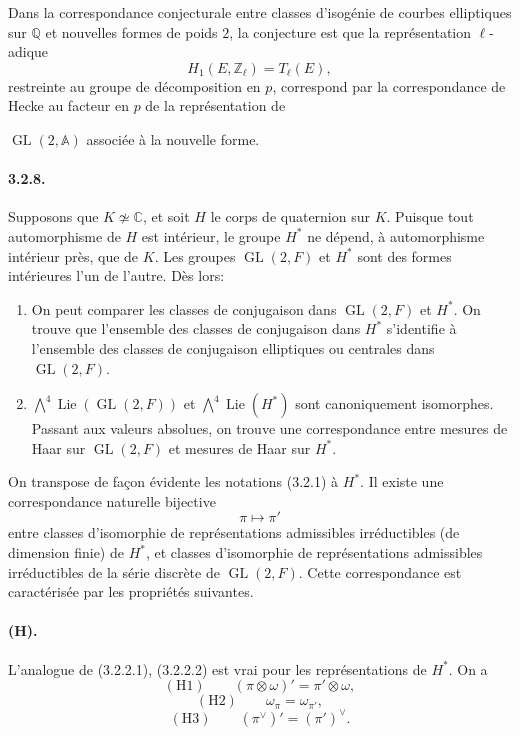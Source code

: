 \documentclass[10pt,a4paper]{article}
\providecommand{\GL}{\operatorname{GL}}
\providecommand{\Lie}{\operatorname{Lie}}
\providecommand{\Q}{\mathbb Q}
\providecommand{\Z}{\mathbb Z}
\providecommand{\C}{\mathbb C}
\providecommand{\A}{\mathbb A}
\begin{document}
Dans la correspondance conjecturale entre classes d'isogénie de courbes elliptiques sur \(\Q\) et nouvelles formes de poids \(2\), la conjecture est que la représentation \(\ell\)-adique
\[
H_1(E,\Z_\ell)=T_\ell(E),
\]
restreinte au groupe de décomposition en \(p\), correspond par la correspondance de Hecke au facteur en \(p\) de la représentation de

\clearpage
{}
\hypertarget{authority-48}{}
\(\GL(2,\A)\) associée à la nouvelle forme.

\paragraph{3.2.8.} Supposons que \(K\not\simeq\C\), et soit \(H\) \textquotedbl le\textquotedbl{} corps de quaternion sur \(K\). Puisque tout automorphisme de \(H\) est intérieur, le groupe \(H^*\) ne dépend, à automorphisme intérieur près, que de \(K\). Les groupes \(\GL(2,F)\) et \(H^*\) sont des formes intérieures l'un de l'autre. Dès lors:

\begin{enumerate}[label=(\alph*)]
\item On peut comparer les classes de conjugaison dans \(\GL(2,F)\) et \(H^*\). On trouve que l'ensemble des classes de conjugaison dans \(H^*\) s'identifie à l'ensemble des classes de conjugaison elliptiques ou centrales dans \(\GL(2,F)\).
\item \(\bigwedge^4\Lie(\GL(2,F))\) et \(\bigwedge^4\Lie(H^*)\) sont canoniquement isomorphes. Passant aux valeurs absolues, on trouve une correspondance entre mesures de Haar sur \(\GL(2,F)\) et mesures de Haar sur \(H^*\).
\end{enumerate}
On transpose de façon évidente les notations (3.2.1) à \(H^*\). Il existe une correspondance naturelle bijective
\[
\pi\longmapsto \pi'
\]
entre classes d'isomorphie de représentations admissibles irréductibles (de dimension finie) de \(H^*\), et classes d'isomorphie de représentations admissibles irréductibles de la série discrète de \(\GL(2,F)\). Cette correspondance est caractérisée par les propriétés suivantes.

\paragraph{(H).} L'analogue de (3.2.2.1), (3.2.2.2) est vrai pour les représentations de \(H^*\). On a
\[
\mathrm{(H1)}\qquad (\pi\otimes\omega)'=\pi'\otimes\omega,
\]
\[
\mathrm{(H2)}\qquad \omega_\pi=\omega_{\pi'},
\]
\[
\mathrm{(H3)}\qquad (\pi^\vee)'=(\pi')^\vee.
\]
\end{document}
